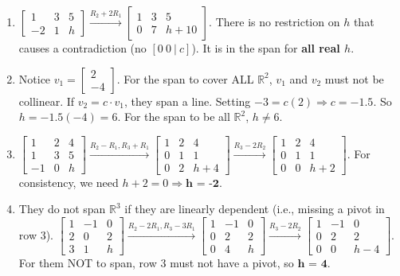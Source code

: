 \documentclass[12pt]{article}
\begin{document}
\begin{enumerate}
    \item $\begin{bmatrix} 1 & 3 & 5 \\ -2 & 1 & h \end{bmatrix} \xrightarrow{R_2+2R_1} \begin{bmatrix} 1 & 3 & 5 \\ 0 & 7 & h+10 \end{bmatrix}$. There is no restriction on $h$ that causes a contradiction (no $[0 \ 0 \ | \ c]$). It is in the span for \textbf{all real $h$}.
    \item Notice $v_1 = \begin{bmatrix} 2 \\ -4 \end{bmatrix}$. For the span to cover ALL $\mathbb{R}^2$, $v_1$ and $v_2$ must not be collinear. If $v_2 = c \cdot v_1$, they span a line. Setting $-3 = c(2) \Rightarrow c = -1.5$. So $h = -1.5(-4) = 6$. For the span to be all $\mathbb{R}^2$, \textbf{$h \neq 6$}.
    \item $\begin{bmatrix} 1 & 2 & 4 \\ 1 & 3 & 5 \\ -1 & 0 & h \end{bmatrix} \xrightarrow{R_2-R_1, R_3+R_1} \begin{bmatrix} 1 & 2 & 4 \\ 0 & 1 & 1 \\ 0 & 2 & h+4 \end{bmatrix} \xrightarrow{R_3-2R_2} \begin{bmatrix} 1 & 2 & 4 \\ 0 & 1 & 1 \\ 0 & 0 & h+2 \end{bmatrix}$. For consistency, we need $h+2 = 0 \Rightarrow \textbf{h = -2}$.
    \item They do not span $\mathbb{R}^3$ if they are linearly dependent (i.e., missing a pivot in row 3). $\begin{bmatrix} 1 & -1 & 0 \\ 2 & 0 & 2 \\ 3 & 1 & h \end{bmatrix} \xrightarrow{R_2-2R_1, R_3-3R_1} \begin{bmatrix} 1 & -1 & 0 \\ 0 & 2 & 2 \\ 0 & 4 & h \end{bmatrix} \xrightarrow{R_3-2R_2} \begin{bmatrix} 1 & -1 & 0 \\ 0 & 2 & 2 \\ 0 & 0 & h-4 \end{bmatrix}$. For them NOT to span, row 3 must not have a pivot, so $\textbf{h = 4}$.


\end{enumerate}
\end{document}
